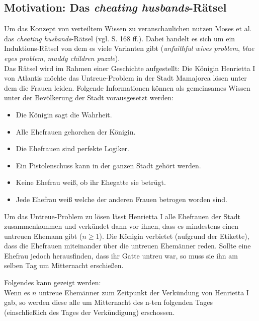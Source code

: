 \documentclass{llncs}
\begin{document}
\subsection{Motivation: Das \textit{cheating husbands}-Rätsel}
Um das Konzept von verteiltem Wissen zu veranschaulichen nutzen Moses et al. \cite{moses1986cheating} das \textit{cheating husbands}-Rätsel (vgl. \cite{moses1986cheating} S. 168 ff.).
Dabei handelt es sich um ein Induktions-Rätsel von dem es viele Varianten gibt (\textit{unfaithful wives problem}, \textit{blue eyes problem}, \textit{muddy children puzzle}).\\
Das Rätsel wird im Rahmen einer Geschichte aufgestellt: Die Königin Henrietta I von Atlantis möchte das Untreue-Problem in der Stadt Mamajorca lösen unter dem die Frauen leiden.
Folgende Informationen können als gemeinsames Wissen unter der Bevölkerung der Stadt vorausgesetzt werden:
\begin{itemize}
	\item Die Königin sagt die Wahrheit.
	\item Alle Ehefrauen gehorchen der Königin.
	\item Die Ehefrauen sind perfekte Logiker.
	\item Ein Pistolenschuss kann in der ganzen Stadt gehört werden.
	\item Keine Ehefrau weiß, ob ihr Ehegatte sie betrügt.
	\item Jede Ehefrau weiß welche der anderen Frauen betrogen worden sind.
\end{itemize}
Um das Untreue-Problem zu lösen lässt Henrietta I alle Ehefrauen der Stadt zusammenkommen und verkündet dann vor ihnen, dass es mindestens einen untreuen Ehemann gibt ($n \ge 1$).
Die Königin verbietet (aufgrund der Etikette), dass die Ehefrauen miteinander über die untreuen Ehemänner reden.
Sollte eine Ehefrau jedoch herausfinden, dass ihr Gatte untreu war, so muss sie ihn am selben Tag um Mitternacht erschießen.\medskip

Folgendes kann gezeigt werden:\\
Wenn es $n$ untreue Ehemänner zum Zeitpunkt der Verkündung von Henrietta I gab, so werden diese alle um Mitternacht des n-ten folgenden Tages (einschließlich des Tages der Verkündigung) erschossen.\medskip
\end{document}
